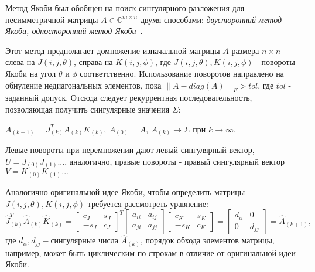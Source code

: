 Метод Якоби был обобщен на поиск сингулярного разложения для несимметричной матрицы $A \in \mathbb{C}^{m\times n}$ двумя способами:\textit{ двусторонний метод Якоби, односторонний метод Якоби}~\cite{Dongarra2018}.

Этот метод предполагает домножение изначальной матрицы $A$ размера $n\times n \ $ слева на $J(i,j,\theta)$, справа на $K(i,j,\phi)$, где $J(i,j,\theta), K(i, j,\phi)$ - повороты Якоби на угол $\theta\text{ и } \phi$ соответственно. Использование поворотов направлено на обнуление недиагональных элементов, пока $\left\| A - diag(A) \right\|_F > tol$, где $tol$ - заданный допуск.
Отсюда следует рекуррентная последовательность, позволяющая получить сингулярные значения $\Sigma$:
\begin{center}
    $A_{(k+1)} = J^T_{(k)}A_{(k)}K_{(k)}, \ A_{(0)}= A, \ A_{(k)}\longrightarrow\Sigma \text{ при } k\to\infty$.
\end{center}

Левые повороты при перемножении дают левый сингулярный вектор, $U=J_{(0)}J_{(1)}...$, аналогично, правые повороты - правый сингулярный вектор $V=K_{(0)}K_{(1)}...$

Аналогично оригинальной идее Якоби, чтобы определить матрицы $J(i,j,\theta), K(i,j,\phi)$ требуется рассмотреть уравнение:
\begin{equation} \label{two-sided Jacobi}
    \hat{J}_{(k)}^T\hat{A}_{(k)}\hat{K}_{(k)} = \begin{bmatrix}
        c_J&s_J\\
        -s_J&c_J
    \end{bmatrix}^T
    \begin{bmatrix}
        a_{ii}&a_{ij}\\
        a_{ji}&a_{jj}
    \end{bmatrix}
    \begin{bmatrix}
        c_K&s_K\\
        -s_K&c_K
    \end{bmatrix} = \begin{bmatrix}
        d_{ii} & 0\\
        0 & d_{jj}
    \end{bmatrix} = \hat{A}_{(k+1)},
\end{equation}
где $d_{ii}, d_{jj} -\text{сингулярные числа } \hat{A}_{(k)}$, порядок обхода элементов матрицы, например, может быть циклическим по строкам в отличие от оригинальной идеи Якоби.

